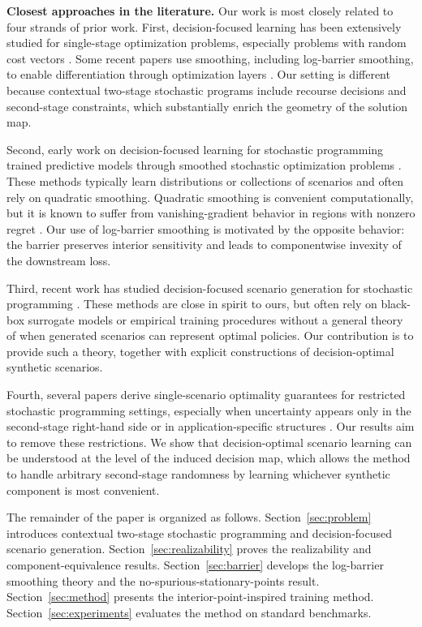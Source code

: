 \textbf{Closest approaches in the literature.}
Our work is most closely related to four strands of prior work. First, decision-focused learning has been extensively studied for single-stage optimization problems, especially problems with random cost vectors \citep{placeholder_single_stage_dfl,placeholder_spo,placeholder_decision_focused_surveys}. Some recent papers use smoothing, including log-barrier smoothing, to enable differentiation through optimization layers \citep{placeholder_log_barrier_dfl,placeholder_mandi_log_barrier}. Our setting is different because contextual two-stage stochastic programs include recourse decisions and second-stage constraints, which substantially enrich the geometry of the solution map.

Second, early work on decision-focused learning for stochastic programming trained predictive models through smoothed stochastic optimization problems \citep{placeholder_donti_stochastic_dfl}. These methods typically learn distributions or collections of scenarios and often rely on quadratic smoothing. Quadratic smoothing is convenient computationally, but it is known to suffer from vanishing-gradient behavior in regions with nonzero regret \citep{placeholder_quadratic_smoothing_vanishing_gradients}. Our use of log-barrier smoothing is motivated by the opposite behavior: the barrier preserves interior sensitivity and leads to componentwise invexity of the downstream loss.

Third, recent work has studied decision-focused scenario generation for stochastic programming \citep{placeholder_islip_scenario_generation,placeholder_scenario_generation_black_box}. These methods are close in spirit to ours, but often rely on black-box surrogate models or empirical training procedures without a general theory of when generated scenarios can represent optimal policies. Our contribution is to provide such a theory, together with explicit constructions of decision-optimal synthetic scenarios.

Fourth, several papers derive single-scenario optimality guarantees for restricted stochastic programming settings, especially when uncertainty appears only in the second-stage right-hand side or in application-specific structures \citep{placeholder_lex_spo,placeholder_homem_de_mello_single_scenario,placeholder_application_specific_single_scenario}. Our results aim to remove these restrictions. We show that decision-optimal scenario learning can be understood at the level of the induced decision map, which allows the method to handle arbitrary second-stage randomness by learning whichever synthetic component is most convenient.

The remainder of the paper is organized as follows. Section~\ref{sec:problem} introduces contextual two-stage stochastic programming and decision-focused scenario generation. Section~\ref{sec:realizability} proves the realizability and component-equivalence results. Section~\ref{sec:barrier} develops the log-barrier smoothing theory and the no-spurious-stationary-points result. Section~\ref{sec:method} presents the interior-point-inspired training method. Section~\ref{sec:experiments} evaluates the method on standard benchmarks.
